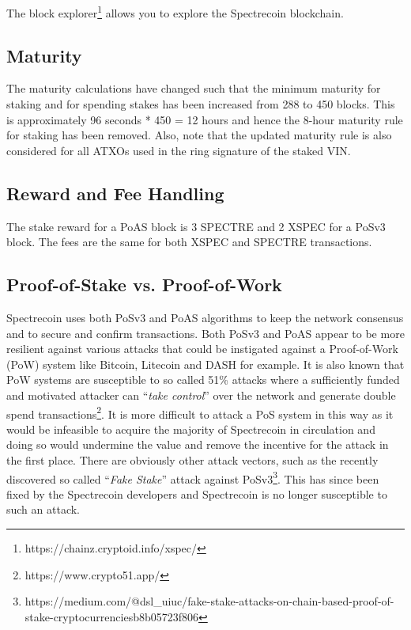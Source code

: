 The block explorer\footnote{https://chainz.cryptoid.info/xspec/} allows you 
to explore the Spectrecoin blockchain.



\subsection{Maturity}
The maturity calculations have changed such that the minimum maturity for
staking and for spending stakes has been increased from 288 to 450 blocks.
This is approximately 96 seconds * 450 = 12 hours and hence the 8-hour
maturity rule for staking has been removed. Also, note that the updated
maturity rule is also considered for all ATXOs used in the ring signature
of the staked VIN.



\subsection{Reward and Fee Handling}
The stake reward for a PoAS block is 3 SPECTRE and 2 XSPEC for a PoSv3 block.
The fees are the same for both XSPEC and SPECTRE transactions.



\subsection{Proof-of-Stake vs. Proof-of-Work}
Spectrecoin uses both PoSv3 and PoAS algorithms to keep the network consensus
and to secure and confirm transactions. Both PoSv3 and PoAS appear to be more
resilient against various attacks that could be instigated against a
Proof-of-Work (PoW) system like Bitcoin, Litecoin and DASH for example.
It is also known that PoW systems are susceptible to so called 51\% attacks
where a sufficiently funded and motivated attacker can “\textit{take control}” over
the network and generate double spend transactions\footnote{https://www.crypto51.app/}. 
It is more difficult to attack a PoS system in this way as it would be infeasible 
to acquire the majority of Spectrecoin in circulation and doing so would undermine 
the value and remove the incentive for the attack in the first place. There are 
obviously other attack vectors, such as the recently discovered so called 
“\textit{Fake Stake}” attack against 
PoSv3\footnote{https://medium.com/@dsl\_uiuc/fake-stake-attacks-on-chain-based-proof-of-stake-cryptocurrenciesb8b05723f806}. 
This has since been fixed by the Spectrecoin developers and Spectrecoin is no 
longer susceptible to such an attack.



